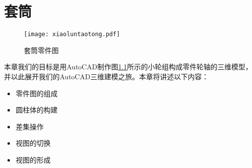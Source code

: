 \chapter{套筒}
\begin{figure}[htbp]
\centering
\texttt{[image: xiaoluntaotong.pdf]}
\caption{套筒零件图}\label{fig:xiaoluntaotong}
\end{figure}
本章我们的目标是用AutoCAD制作图\ref{fig:xiaoluntaotong}所示的小轮组构成零件轮轴的三维模型，并以此展开我们的AutoCAD三维建模之旅。本章将讲述以下内容：
\begin{itemize}
	\item 零件图的组成
	\item 圆柱体的构建
	\item 差集操作
	\item 视图的切换
	\item 视图的形成
\end{itemize}



\endinput